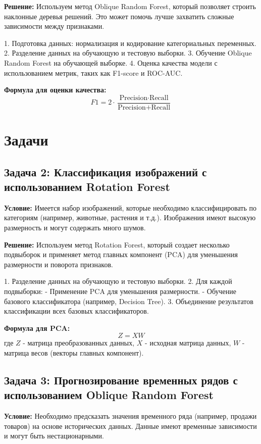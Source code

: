 \textbf{Решение:}
Используем метод Oblique Random Forest, который позволяет строить наклонные деревья решений. Это может помочь лучше захватить сложные зависимости между признаками.

1. Подготовка данных: нормализация и кодирование категориальных переменных.
2. Разделение данных на обучающую и тестовую выборки.
3. Обучение Oblique Random Forest на обучающей выборке.
4. Оценка качества модели с использованием метрик, таких как F1-score и ROC-AUC.

\textbf{Формула для оценки качества:}
\[
    F1 = 2 \cdot \frac{\text{Precision} \cdot \text{Recall}}{\text{Precision} + \text{Recall}}
\]

\section{Задачи}

\subsection*{Задача 2: Классификация изображений с использованием Rotation Forest}

\textbf{Условие:}
Имеется набор изображений, которые необходимо классифицировать по категориям (например, животные, растения и т.д.). Изображения имеют высокую размерность и могут содержать много шумов.

\textbf{Решение:}
Используем метод Rotation Forest, который создает несколько подвыборок и применяет метод главных компонент (PCA) для уменьшения размерности и поворота признаков.

1. Разделение данных на обучающую и тестовую выборки.
2. Для каждой подвыборки:
- Применение PCA для уменьшения размерности.
- Обучение базового классификатора (например, Decision Tree).
3. Объединение результатов классификации всех базовых классификаторов.

\textbf{Формула для PCA:}
\[
    Z = XW
\]
где \(Z\) - матрица преобразованных данных, \(X\) - исходная матрица данных, \(W\) - матрица весов (векторы главных компонент).

\subsection*{Задача 3: Прогнозирование временных рядов с использованием Oblique Random Forest}

\textbf{Условие:}
Необходимо предсказать значения временного ряда (например, продажи товаров) на основе исторических данных. Данные имеют временные зависимости и могут быть нестационарными.

